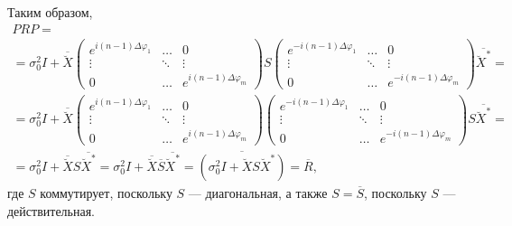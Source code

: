 Таким образом,
\begin{multline*}
    P R P = \\
    = \sigma_0^2 I
    + \overline{\breve{X}}
    \begin{pmatrix}
        e^{i (n-1) \Delta \varphi_1} & \dots  & 0                              \\
        \vdots                         & \ddots & \vdots                         \\
        0                              & \dots  & e^{i (n-1) \Delta \varphi_m}
    \end{pmatrix}
    S
    \begin{pmatrix}
        e^{- i (n-1) \Delta \varphi_1} & \dots  & 0                            \\
        \vdots                       & \ddots & \vdots                       \\
        0                            & \dots  & e^{- i (n-1) \Delta \varphi_m}
    \end{pmatrix}
    \overline{\breve{X}^*} = \\
    = \sigma_0^2 I
    + \overline{\breve{X}}
    \begin{pmatrix}
        e^{i (n-1) \Delta \varphi_1} & \dots  & 0                              \\
        \vdots                         & \ddots & \vdots                         \\
        0                              & \dots  & e^{i (n-1) \Delta \varphi_m}
    \end{pmatrix}
    \begin{pmatrix}
        e^{- i (n-1) \Delta \varphi_1} & \dots  & 0                            \\
        \vdots                       & \ddots & \vdots                       \\
        0                            & \dots  & e^{- i (n-1) \Delta \varphi_m}
    \end{pmatrix}
    S
    \overline{\breve{X}^*} = \\
    = \sigma_0^2 I + \overline{\breve{X}} S \overline{\breve{X}^*}
    = \sigma_0^2 I + \overline{\breve{X}} \overline{S} \overline{\breve{X}^*}
    = \overline{\left( \sigma_0^2 I + \breve{X} S \breve{X}^* \right)}
    = \overline{R} ,
\end{multline*}
где $S$ коммутирует, поскольку $S$ --- диагональная, а также $S = \overline{S}$, поскольку $S$ --- действительная.

